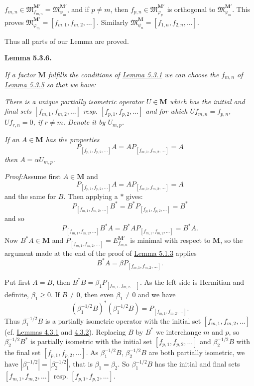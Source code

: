 \documentclass[12pt,b5paper,twoside]{article}
\newcommand{\M}{\mathbf M}
\newcommand{\Lemma}[1]{%
  \par\smallskip\noindent\phantomsection\label{lem:#1}\textbf{Lemma #1.}\enspace
}
\newcommand{\Proof}{\par\noindent\textit{Proof:}\enspace}
\newcommand{\lemref}[1]{\hyperref[lem:#1]{Lemma #1}}
\begin{document}
$f_{m,n}\in\mathfrak M_{f_{m,n}}^{\M'}
=\mathfrak M_{\varphi_m}^{\M'}$, and if $p\neq m$, then
$f_{p,n}\in\mathfrak M_{\varphi_p}^{\M'}$ is orthogonal to
$\mathfrak M_{\varphi_m}^{\M'}$. This proves
$\mathfrak M_{\varphi_m}^{\M'}=[f_{m,1},f_{m,2},\ldots]$. Similarly
$\mathfrak M_{\psi_n}^{\M}=[f_{1,n},f_{2,n},\ldots]$.

Thus all parts of our Lemma are proved.

\Lemma{5.3.6}
\emph{If a factor $\M$ fulfills the conditions of \lemref{5.3.1} we can
choose the $f_{m,n}$ of \lemref{5.3.5} so that we have:}

\emph{There is a unique partially isometric operator $U\in\M$ which has the
initial and final sets $[f_{m,1},f_{m,2},\ldots]$ resp.
$[f_{p,1},f_{p,2},\ldots]$ and for which $Uf_{m,n}=f_{p,n}$,
$Uf_{r,n}=0$, if $r\neq m$. Denote it by $U_{m,p}$.}

\emph{If an $A\in\M$ has the properties}
\[
 P_{[f_{p,1},f_{p,2},\ldots]}A
 =AP_{[f_{m,1},f_{m,2},\ldots]}=A
\]
\emph{then $A=\alpha U_{m,p}$.}

\Proof Assume first $A\in\M$ and
\[
 P_{[f_{p,1},f_{p,2},\ldots]}A
 =AP_{[f_{m,1},f_{m,2},\ldots]}=A
\]
and the same for $B$. Then applying a $*$ gives:
\[
 P_{[f_{m,1},f_{m,2},\ldots]}B^*
 =B^*P_{[f_{p,1},f_{p,2},\ldots]}=B^*
\]
and so
\[
 P_{[f_{m,1},f_{m,2},\ldots]}B^*A
 =B^*AP_{[f_{m,1},f_{m,2},\ldots]}=B^*A.
\]
Now $B^*A\in\M$ and
$P_{[f_{m,1},f_{m,2},\ldots]}=E_{f_{m,n}}^{\M'}$ is minimal with respect to
$\M$, so the argument made at the end of the proof of \lemref{5.1.3} applies
\[
 B^*A=\beta P_{[f_{m,1},f_{m,2},\ldots]}.
\]

Put first $A=B$, then
$B^*B=\beta_1P_{[f_{m,1},f_{m,2},\ldots]}$. As the left side is Hermitian
and definite, $\beta_1\geq0$. If $B\neq0$, then even $\beta_1\neq0$ and we
have
\[
 (\beta_1^{-1/2}B)^*(\beta_1^{-1/2}B)
 =P_{[f_{m,1},f_{m,2},\ldots]}.
\]
Thus $\beta_1^{-1/2}B$ is a partially isometric operator with the initial set
$[f_{m,1},f_{m,2},\ldots]$ (cf. \hyperref[lem:4.3.1]{Lemmas 4.3.1} and
\hyperref[lem:4.3.2]{4.3.2}). Replacing $B$ by $B^*$ we interchange $m$ and $p$, so
$\beta_2^{-1/2}B^*$ is partially isometric with the initial set
$[f_{p,1},f_{p,2},\ldots]$ and $\beta_2^{-1/2}B$ with the final set
$[f_{p,1},f_{p,2},\ldots]$. As $\beta_1^{-1/2}B$,
$\beta_2^{-1/2}B$ are both partially isometric, we have
$|\beta_1^{-1/2}|=|\beta_2^{-1/2}|$, that is $\beta_1=\beta_2$. So
$\beta_1^{-1/2}B$ has the initial and final sets
$[f_{m,1},f_{m,2},\ldots]$ resp. $[f_{p,1},f_{p,2},\ldots]$.
\end{document}
